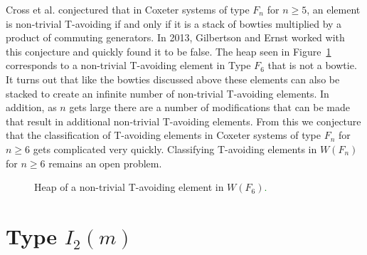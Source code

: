 Cross et al. conjectured that in Coxeter systems of type $F_n$ for $n \geq 5$, an element is non-trivial T-avoiding if and only if it is a stack of bowties multiplied by a product of commuting generators. In 2013, Gilbertson and Ernst worked with this conjecture and quickly found it to be false. The heap seen in Figure~\ref{fig:f6bat} corresponds to a non-trivial T-avoiding element in Type $F_6$ that is not a bowtie. It turns out that like the bowties discussed above these elements can also be stacked to create an infinite number of non-trivial T-avoiding elements. In addition, as $n$ gets large there are a number of modifications that can be made that result in additional non-trivial T-avoiding elements. From this we conjecture that the classification of T-avoiding elements in Coxeter systems of type $F_n$ for $n \geq 6$ gets complicated very quickly. Classifying T-avoiding elements in $W(F_n)$ for $n \geq 6$ remains an open problem. 

\begin{figure}[h!]\centering
{}
\caption{Heap of a non-trivial T-avoiding element in $W(F_6)$\textcolor{green}{.}}\label{fig:f6bat}
\end{figure}


\section{Type $I_2(m)$}\label{sec:tavoidI}

